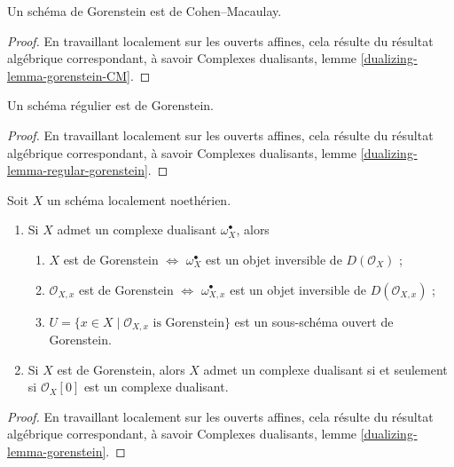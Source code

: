 \begin{lemma}
\label{lemma-gorenstein-CM}
Un schéma de Gorenstein est de Cohen–Macaulay.
\end{lemma}

\begin{proof}
En travaillant localement sur les ouverts affines, cela résulte du résultat algébrique correspondant, à savoir Complexes dualisants, lemme \ref{dualizing-lemma-gorenstein-CM}.
\end{proof}

\begin{lemma}
\label{lemma-regular-gorenstein}
Un schéma régulier est de Gorenstein.
\end{lemma}

\begin{proof}
En travaillant localement sur les ouverts affines, cela résulte du résultat algébrique correspondant, à savoir Complexes dualisants, lemme \ref{dualizing-lemma-regular-gorenstein}.
\end{proof}

\begin{lemma}
\label{lemma-gorenstein}
Soit $X$ un schéma localement noethérien.
\begin{enumerate}
\item Si $X$ admet un complexe dualisant $\omega_X^\bullet$, alors
\begin{enumerate}
\item $X$ est de Gorenstein $\Leftrightarrow$ $\omega_X^\bullet$ est un objet inversible de $D(\mathcal{O}_X)$ ;
\item $\mathcal{O}_{X, x}$ est de Gorenstein $\Leftrightarrow$ $\omega_{X, x}^\bullet$ est un objet inversible de $D(\mathcal{O}_{X, x})$ ;
\item $U = \{x \in X \mid \mathcal{O}_{X, x}\text{ is Gorenstein}\}$ est un sous-schéma ouvert de Gorenstein.
\end{enumerate}
\item Si $X$ est de Gorenstein, alors $X$ admet un complexe dualisant si et seulement si $\mathcal{O}_X[0]$ est un complexe dualisant.
\end{enumerate}
\end{lemma}

\begin{proof}
En travaillant localement sur les ouverts affines, cela résulte du résultat algébrique correspondant, à savoir Complexes dualisants, lemme \ref{dualizing-lemma-gorenstein}.
\end{proof}

